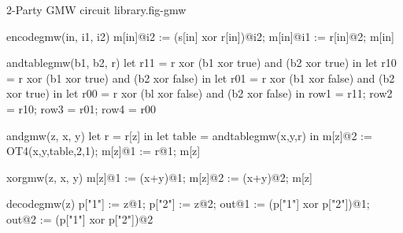 \begin{fpfig}[t]{2-Party GMW circuit library.}{fig-gmw}
{\footnotesize
  \begin{verbatimtab}
    encodegmw(in, i1, i2) {
      m[in]@i2 := (s[in] xor r[in])@i2;
      m[in]@i1 := r[in]@2;
      m[in]
    }
    
    andtablegmw(b1, b2, r) {
      let r11 = r xor (b1 xor true) and (b2 xor true) in
      let r10 = r xor (b1 xor true) and (b2 xor false) in
      let r01 = r xor (b1 xor false) and (b2 xor true) in
      let r00 = r xor (bl xor false) and (b2 xor false) in
      { row1 = r11; row2 = r10; row3 = r01; row4 = r00 }
    }
    
    andgmw(z, x, y) {
      let r = r[z] in
      let table = andtablegmw(x,y,r) in
      m[z]@2 := OT4(x,y,table,2,1);
      m[z]@1 := r@1;
      m[z]
    }
    
    xorgmw(z, x, y) { m[z]@1 := (x+y)@1; m[z]@2 := (x+y)@2; m[z] }
    
    decodegmw(z) {
      p["1"] := z@1; p["2"] := z@2;
      out@1 := (p["1"] xor p["2"])@1;
      out@2 := (p["1"] xor p["2"])@2
    }
  \end{verbatimtab}
}
\end{fpfig}
